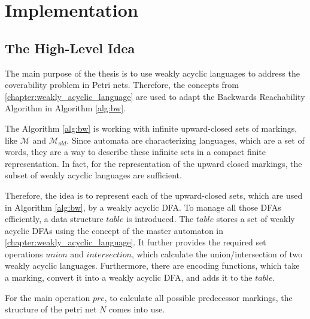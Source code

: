 \chapter{Implementation}\label{chapter:implementation}

\section{The High-Level Idea}
The main purpose of the thesis is to use weakly acyclic languages to address the coverability problem in Petri nets. Therefore, the concepts from \autoref{chapter:weakly_acyclic_language} are used to adapt the Backwards Reachability Algorithm in Algorithm \autoref{alg:bw}.
\par
The Algorithm \autoref{alg:bw} is working with infinite upward-closed sets of markings, like $\mathcal{M}$ and $\mathcal{M}_{old}$. Since automata are characterizing languages, which are a set of words, they are a way to describe these infinite sets in a compact finite representation. In fact, for the representation of the upward closed markings, the subset of weakly acyclic languages are sufficient.
\par
Therefore, the idea is to represent each of the upward-closed sets, which are used in Algorithm \autoref{alg:bw}, by a weakly acyclic DFA. To manage all those DFAs efficiently, a data structure $table$ is introduced. The $table$ stores a set of weakly acyclic DFAs using the concept of the master automaton in \autoref{chapter:weakly_acyclic_language}. It further provides the required set operations $union$ and $intersection$, which calculate the union/intersection of two weakly acyclic languages. Furthermore, there are encoding functions, which take a marking, convert it into a weakly acyclic DFA, and adds it to the $table$.
\par
For the main operation $pre$, to calculate all possible predecessor markings, the structure of the petri net $N$ comes into use. 



